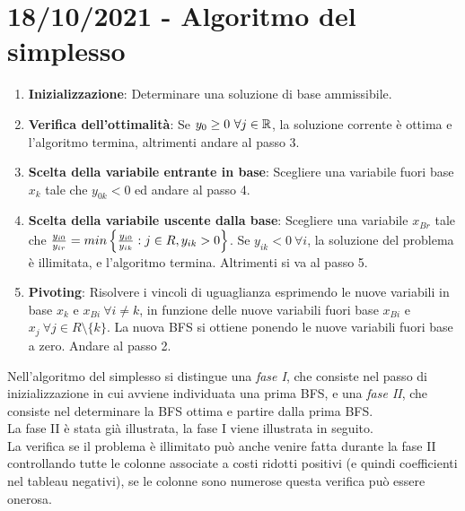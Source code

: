 \documentclass[12pt,a4paper]{article}
\begin{document}
\section{18/10/2021 - Algoritmo del simplesso}
\begin{enumerate}
\item \textbf{Inizializzazione}: Determinare una soluzione di base ammissibile.
\item \textbf{Verifica dell'ottimalità}: Se $y_0\geq 0\  \forall j \in \mathbb{R}$, la soluzione corrente è ottima e l'algoritmo termina, altrimenti andare al passo 3.
\item \textbf{Scelta della variabile entrante in base}: Scegliere una variabile fuori base $x_k$ tale che $y_{0k} < 0$ ed andare al passo 4.
\item \textbf{Scelta della variabile uscente dalla base}: Scegliere una variabile $x_{Br}$ tale che ${y_{i0} \over y_{ir}} = min\left\{{y_{i0} \over y_{ik}} : j \in R, y_{ik} > 0\right\}$. Se $y_{ik} < 0 \ \forall i$, la soluzione del problema è illimitata, e l’algoritmo termina. Altrimenti si va al passo 5.
\item \textbf{Pivoting}: Risolvere i vincoli di uguaglianza esprimendo le nuove variabili in base $x_k$ e $x_{Bi} \ \forall i \not = k$, in funzione delle nuove variabili fuori base $x_{Bi}$ e $x_j\ \forall j \in R \setminus \{k\}$. La nuova BFS si ottiene ponendo le nuove variabili fuori base a zero. Andare al passo 2.
\end{enumerate}
Nell'algoritmo del simplesso si distingue una \textsl{fase I}, che consiste nel passo di inizializzazione in cui avviene individuata una prima BFS, e una \textsl{fase II}, che consiste nel determinare la BFS ottima e partire dalla prima BFS.\\
La fase II è stata già illustrata, la fase I viene illustrata in seguito.\\
La verifica se il problema è illimitato può anche venire fatta durante la fase II controllando tutte le colonne associate a costi ridotti positivi (e quindi coefficienti nel tableau negativi), se le colonne sono numerose questa verifica può essere onerosa.
\end{document}
